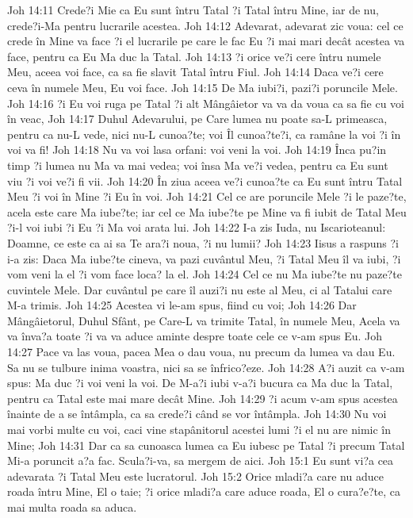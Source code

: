 Joh 14:11  Crede?i Mie ca Eu sunt întru Tatal ?i Tatal întru Mine, iar de nu, crede?i-Ma pentru lucrarile acestea.
Joh 14:12  Adevarat, adevarat zic voua: cel ce crede în Mine va face ?i el lucrarile pe care le fac Eu ?i mai mari decât acestea va face, pentru ca Eu Ma duc la Tatal.
Joh 14:13  ?i orice ve?i cere întru numele Meu, aceea voi face, ca sa fie slavit Tatal întru Fiul.
Joh 14:14  Daca ve?i cere ceva în numele Meu, Eu voi face.
Joh 14:15  De Ma iubi?i, pazi?i poruncile Mele.
Joh 14:16  ?i Eu voi ruga pe Tatal ?i alt Mângâietor va va da voua ca sa fie cu voi în veac,
Joh 14:17  Duhul Adevarului, pe Care lumea nu poate sa-L primeasca, pentru ca nu-L vede, nici nu-L cunoa?te; voi Îl cunoa?te?i, ca ramâne la voi ?i în voi va fi!
Joh 14:18  Nu va voi lasa orfani: voi veni la voi.
Joh 14:19  Înca pu?in timp ?i lumea nu Ma va mai vedea; voi însa Ma ve?i vedea, pentru ca Eu sunt viu ?i voi ve?i fi vii.
Joh 14:20  În ziua aceea ve?i cunoa?te ca Eu sunt întru Tatal Meu ?i voi în Mine ?i Eu în voi.
Joh 14:21  Cel ce are poruncile Mele ?i le paze?te, acela este care Ma iube?te; iar cel ce Ma iube?te pe Mine va fi iubit de Tatal Meu ?i-l voi iubi ?i Eu ?i Ma voi arata lui.
Joh 14:22  I-a zis Iuda, nu Iscarioteanul: Doamne, ce este ca ai sa Te ara?i noua, ?i nu lumii?
Joh 14:23  Iisus a raspuns ?i i-a zis: Daca Ma iube?te cineva, va pazi cuvântul Meu, ?i Tatal Meu îl va iubi, ?i vom veni la el ?i vom face loca? la el.
Joh 14:24  Cel ce nu Ma iube?te nu paze?te cuvintele Mele. Dar cuvântul pe care îl auzi?i nu este al Meu, ci al Tatalui care M-a trimis.
Joh 14:25  Acestea vi le-am spus, fiind cu voi;
Joh 14:26  Dar Mângâietorul, Duhul Sfânt, pe Care-L va trimite Tatal, în numele Meu, Acela va va înva?a toate ?i va va aduce aminte despre toate cele ce v-am spus Eu.
Joh 14:27  Pace va las voua, pacea Mea o dau voua, nu precum da lumea va dau Eu. Sa nu se tulbure inima voastra, nici sa se înfrico?eze.
Joh 14:28  A?i auzit ca v-am spus: Ma duc ?i voi veni la voi. De M-a?i iubi v-a?i bucura ca Ma duc la Tatal, pentru ca Tatal este mai mare decât Mine.
Joh 14:29  ?i acum v-am spus acestea înainte de a se întâmpla, ca sa crede?i când se vor întâmpla.
Joh 14:30  Nu voi mai vorbi multe cu voi, caci vine stapânitorul acestei lumi ?i el nu are nimic în Mine;
Joh 14:31  Dar ca sa cunoasca lumea ca Eu iubesc pe Tatal ?i precum Tatal Mi-a poruncit a?a fac. Scula?i-va, sa mergem de aici.
Joh 15:1  Eu sunt vi?a cea adevarata ?i Tatal Meu este lucratorul.
Joh 15:2  Orice mladi?a care nu aduce roada întru Mine, El o taie; ?i orice mladi?a care aduce roada, El o cura?e?te, ca mai multa roada sa aduca.
